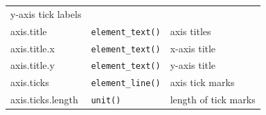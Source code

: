 \begin{longtable}[c]{@{}lll@{}}
\begin{minipage}[t]{0.35\columnwidth}\raggedright\strut
y-axis tick labels
\strut\end{minipage}\tabularnewline
\begin{minipage}[t]{0.27\columnwidth}\raggedright\strut
axis.title
\strut\end{minipage} &
\begin{minipage}[t]{0.25\columnwidth}\raggedright\strut
\texttt{element\_text()}
\strut\end{minipage} &
\begin{minipage}[t]{0.35\columnwidth}\raggedright\strut
axis titles
\strut\end{minipage}\tabularnewline
\begin{minipage}[t]{0.27\columnwidth}\raggedright\strut
axis.title.x
\strut\end{minipage} &
\begin{minipage}[t]{0.25\columnwidth}\raggedright\strut
\texttt{element\_text()}
\strut\end{minipage} &
\begin{minipage}[t]{0.35\columnwidth}\raggedright\strut
x-axis title
\strut\end{minipage}\tabularnewline
\begin{minipage}[t]{0.27\columnwidth}\raggedright\strut
axis.title.y
\strut\end{minipage} &
\begin{minipage}[t]{0.25\columnwidth}\raggedright\strut
\texttt{element\_text()}
\strut\end{minipage} &
\begin{minipage}[t]{0.35\columnwidth}\raggedright\strut
y-axis title
\strut\end{minipage}\tabularnewline
\begin{minipage}[t]{0.27\columnwidth}\raggedright\strut
axis.ticks
\strut\end{minipage} &
\begin{minipage}[t]{0.25\columnwidth}\raggedright\strut
\texttt{element\_line()}
\strut\end{minipage} &
\begin{minipage}[t]{0.35\columnwidth}\raggedright\strut
axis tick marks
\strut\end{minipage}\tabularnewline
\begin{minipage}[t]{0.27\columnwidth}\raggedright\strut
axis.ticks.length
\strut\end{minipage} &
\begin{minipage}[t]{0.25\columnwidth}\raggedright\strut
\texttt{unit()}
\strut\end{minipage} &
\begin{minipage}[t]{0.35\columnwidth}\raggedright\strut
length of tick marks
\strut\end{minipage}\tabularnewline
\bottomrule
\end{longtable}

